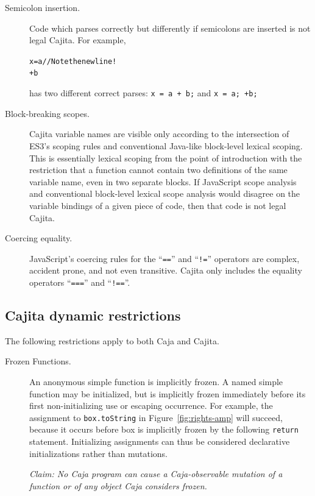 \documentclass[letterpaper,twocolumn,10pt]{article}
\newcommand{\code}[1]{{\tt {#1}}}              %
\begin{document}
\begin{description}
    \item[Semicolon insertion.] Code which parses correctly but differently if semicolons are inserted is not 
    legal Cajita.  For example, 
\begin{alltt}
x = a // Note the newline! \\
      + b
\end{alltt}
    has two different correct parses: \code{x = a + b;} and \code{x = a; +b;}
    
    \item[Block-breaking scopes.] Cajita variable names are visible only according to the intersection of ES3's 
    scoping rules and conventional Java-like block-level lexical scoping. This is essentially lexical scoping from 
    the point of introduction with the restriction that a function cannot contain two definitions of the same 
    variable name, even in two separate blocks. If JavaScript scope analysis and conventional block-level lexical 
    scope analysis would disagree on the variable bindings of a given piece of code, then that code is not legal 
    Cajita.
    
    \item[Coercing equality.] JavaScript's coercing rules for the ``\code{==}'' and ``\code{!=}'' operators are 
    complex, accident prone, and not even transitive. Cajita only includes the equality operators ``\code{===}'' and 
    ``\code{!==}''.
        
\end{description}


\subsection{Cajita dynamic restrictions}
\label{subsec:cajita:dynamic}

The following restrictions apply to both Caja and Cajita.

\begin{description}

  \item[Frozen Functions.] An anonymous simple function is implicitly frozen. 
  A named simple function may be initialized, but is implicitly frozen 
  immediately before its first non-initializing use or escaping occurrence. 
  For example, the assignment to \code{box.toString} in 
  Figure~\ref{fig:rights-amp} will succeed, because it occurs before box is 
  implicitly frozen by the following \code{return} statement. Initializing 
  assignments can thus be considered declarative initializations rather than 
  mutations.
  
  \emph{Claim: No Caja program can cause a Caja-observable mutation of a 
  function or of any object Caja considers frozen.}
  
\end{description}
\end{document}

